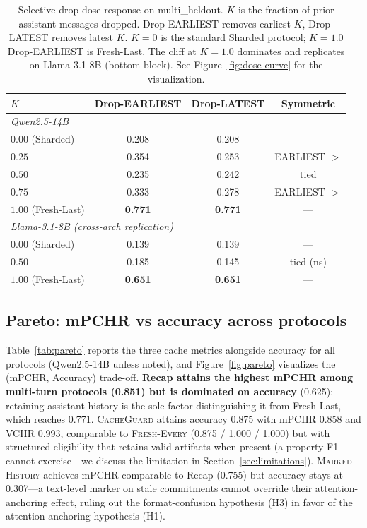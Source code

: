 \documentclass{article}
\begin{document}
\begin{table}[t]
\centering
\caption{Selective-drop dose-response on multi\_heldout. $K$ is the fraction of prior assistant messages dropped. Drop-EARLIEST removes earliest $K$, Drop-LATEST removes latest $K$. $K=0$ is the standard Sharded protocol; $K=1.0$ Drop-EARLIEST is Fresh-Last. The cliff at $K=1.0$ dominates and replicates on Llama-3.1-8B (bottom block). See Figure~\ref{fig:dose-curve} for the visualization.}
\label{tab:dose}
\begin{tabular}{lccc}
\toprule
$K$ & Drop-EARLIEST & Drop-LATEST & Symmetric \\
\midrule
\multicolumn{4}{l}{\textit{Qwen2.5-14B}} \\
$0.00$ (Sharded) & 0.208 & 0.208 & --- \\
$0.25$ & 0.354 & 0.253 & EARLIEST $>$ \\
$0.50$ & 0.235 & 0.242 & tied \\
$0.75$ & 0.333 & 0.278 & EARLIEST $>$ \\
$1.00$ (Fresh-Last) & \textbf{0.771} & \textbf{0.771} & --- \\
\midrule
\multicolumn{4}{l}{\textit{Llama-3.1-8B (cross-arch replication)}} \\
$0.00$ (Sharded) & 0.139 & 0.139 & --- \\
$0.50$ & 0.185 & 0.145 & tied (ns) \\
$1.00$ (Fresh-Last) & \textbf{0.651} & \textbf{0.651} & --- \\
\bottomrule
\end{tabular}
\end{table}

\subsection{Pareto: mPCHR vs accuracy across protocols}
\label{sec:pareto}

Table~\ref{tab:pareto} reports the three cache metrics alongside accuracy for all protocols (Qwen2.5-14B unless noted), and Figure~\ref{fig:pareto} visualizes the (mPCHR, Accuracy) trade-off. \textbf{Recap attains the highest mPCHR among multi-turn protocols (0.851) but is dominated on accuracy} (0.625): retaining assistant history is the sole factor distinguishing it from Fresh-Last, which reaches 0.771. \textsc{CacheGuard} attains accuracy 0.875 with mPCHR 0.858 and VCHR 0.993, comparable to \textsc{Fresh-Every} (0.875 / 1.000 / 1.000) but with structured eligibility that retains valid artifacts when present (a property F1 cannot exercise---we discuss the limitation in Section~\ref{sec:limitations}). \textsc{Marked-History} achieves mPCHR comparable to Recap (0.755) but accuracy stays at 0.307---a text-level marker on stale commitments cannot override their attention-anchoring effect, ruling out the format-confusion hypothesis (H3) in favor of the attention-anchoring hypothesis (H1).
\end{document}
